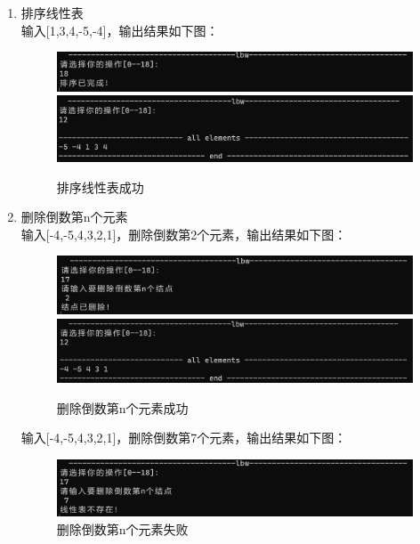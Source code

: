 \documentclass[supercite]{Experimental_Report}
\theoremstyle{definition}
\begin{document}
\begin{enumerate}
		\item 排序线性表\\
		输入[1,3,4,-5,-4]，输出结果如下图：
		\begin{figure}[htbp]
			\centering
			\begin{minipage}{0.7\linewidth}
				\centering
				\includegraphics[width=0.9\linewidth]{images/排序成功.png}
				\includegraphics[width=0.9\linewidth]{images/排序结果.png}
			\end{minipage}
			\caption{排序线性表成功}
			\label{fig1-31}
		\end{figure}
		\item 删除倒数第n个元素\\
		输入[-4,-5,4,3,2,1]，删除倒数第2个元素，输出结果如下图：
		\begin{figure}[htbp]
			\centering
			\begin{minipage}{0.7\linewidth}
				\centering
				\includegraphics[width=0.9\linewidth]{images/从后删除成功.png}
				\includegraphics[width=0.9\linewidth]{images/从后删除结果.png}
			\end{minipage}
			\caption{ 删除倒数第n个元素成功}
			\label{fig1-32}
		\end{figure}
	
		输入[-4,-5,4,3,2,1]，删除倒数第7个元素，输出结果如下图：
		\begin{figure}[htbp]
			\centering
			\begin{minipage}{0.7\linewidth}
				\centering
				\includegraphics[width=0.9\linewidth]{images/从后删除失败.png}
			\end{minipage}
			\caption{ 删除倒数第n个元素失败}
			\label{fig1-33}
		\end{figure}
		

\end{enumerate}
\end{document}
